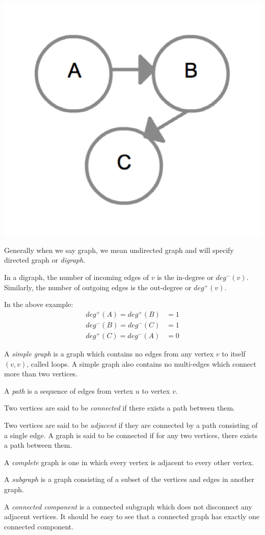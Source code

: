 {
  \includegraphics[scale=0.2]{DiGraph}
  \label{fig:DiGraph}
}

Generally when we say graph, we mean undirected graph and will specify
directed graph or \emph{digraph}.

In a digraph, the number of incoming edges of $v$ is the in-degree or
$deg^-(v)$.  Similarly, the number of outgoing edges is the
out-degree or $deg^+(v)$.

In the above example:
%
\begin{align*}
deg^+(A) = deg^+(B) &= 1 \\
deg^-(B) = deg^-(C) &= 1 \\
deg^+(C) = deg^-(A) &= 0
\end{align*}

A \emph{simple graph} is a graph which contains no edges from any
vertex $v$ to itself $ (v,v) $, called loops.  A simple graph also
contains no multi-edges which connect more than two vertices.

A \emph{path} is a sequence of edges from vertex $u$ to vertex $v$.

Two vertices are said to be \emph{connected} if there exists a path
between them.  

Two vertices are said to be \emph{adjacent} if they are connected by a
path consisting of a single edge.  A graph is said to be connected if
for any two vertices, there exists a path between them.

A \emph{complete} graph is one in which every vertex is adjacent to
every other vertex.

A \emph{subgraph} is a graph consisting of a subset of the vertices
and edges in another graph.

A \emph{connected component} is a connected subgraph which does
not disconnect any adjacent vertices.  It should be easy to see that a
connected graph has exactly one connected component.
